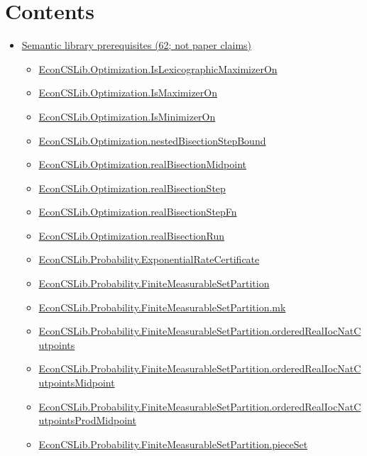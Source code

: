 \documentclass[10pt]{article}
\begin{document}
\section*{Contents}
\begin{itemize}[leftmargin=1.2em]
\item \hyperlink{library-section-a85f9574c44a156c}{Semantic library prerequisites (62; not paper claims)}
\begin{itemize}[leftmargin=1.2em]
\item \hyperlink{library-prerequisite-29ba02126b109d91}{EconCSLib.Optimization.IsLexicographicMaximizerOn}
\item \hyperlink{library-prerequisite-0a2e53c8e507cb74}{EconCSLib.Optimization.IsMaximizerOn}
\item \hyperlink{library-prerequisite-9e10d8e3c1b32191}{EconCSLib.Optimization.IsMinimizerOn}
\item \hyperlink{library-prerequisite-8d013dcbf8315291}{EconCSLib.Optimization.nestedBisectionStepBound}
\item \hyperlink{library-prerequisite-33a658a76ab86d8b}{EconCSLib.Optimization.realBisectionMidpoint}
\item \hyperlink{library-prerequisite-f7e825d2da547274}{EconCSLib.Optimization.realBisectionStep}
\item \hyperlink{library-prerequisite-e24bfb229e6e0f0c}{EconCSLib.Optimization.realBisectionStepFn}
\item \hyperlink{library-prerequisite-5b79c0723b67e9a9}{EconCSLib.Optimization.realBisectionRun}
\item \hyperlink{library-prerequisite-e4ddb15be8735d63}{EconCSLib.Probability.ExponentialRateCertificate}
\item \hyperlink{library-prerequisite-8386068971d3a1c1}{EconCSLib.Probability.FiniteMeasurableSetPartition}
\item \hyperlink{library-prerequisite-94654614a042c92d}{EconCSLib.Probability.FiniteMeasurableSetPartition.mk}
\item \hyperlink{library-prerequisite-6f62f2ee03548cd2}{EconCSLib.Probability.FiniteMeasurableSetPartition.orderedRealIocNatCutpoints}
\item \hyperlink{library-prerequisite-aab7fae9d893ec88}{EconCSLib.Probability.FiniteMeasurableSetPartition.orderedRealIocNatCutpointsMidpoint}
\item \hyperlink{library-prerequisite-0b261505488b443f}{EconCSLib.Probability.FiniteMeasurableSetPartition.orderedRealIocNatCutpointsProdMidpoint}
\item \hyperlink{library-prerequisite-5833c2529d9caeeb}{EconCSLib.Probability.FiniteMeasurableSetPartition.pieceSet}

\end{itemize}
\end{itemize}
\end{document}
